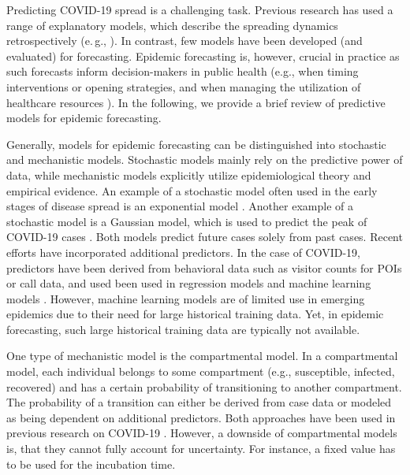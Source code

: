 \documentclass[sigconf, review = false, nonacm = true]{acmart}
\begin{document}
Predicting COVID-19 spread is a challenging task. Previous research has used a range of explanatory models, which describe the spreading dynamics retrospectively (e.\,g., \cite{persson_monitoring_2021, banholzer_impact_2020}). In contrast, few models have been developed (and evaluated) for forecasting. Epidemic forecasting is, however, crucial in practice as such forecasts inform decision-makers in public health (e.g., when timing interventions or opening strategies, and when managing the utilization of healthcare resources \cite{ferguson_report_2020}). In the following, we provide a brief review of predictive models for epidemic forecasting.

Generally, models for epidemic forecasting can be distinguished into stochastic and mechanistic models. Stochastic models mainly rely on the predictive power of data, while mechanistic models explicitly utilize epidemiological theory and empirical evidence. An example of a stochastic model often used in the early stages of disease spread is an exponential model \cite{bertozzi_challenges_2020}. Another example of a stochastic model is a Gaussian model, which is used to predict the peak of COVID-19 cases \cite{schlickeiser_gaussian_2020}. Both models predict future cases solely from past cases. Recent efforts have incorporated additional predictors. In the case of COVID-19, predictors have been derived from behavioral data such as visitor counts for POIs or call data, and used been used in regression models  \cite{rostami-tabar_forecasting_2021} and machine learning models \cite{wieczorek_neural_2020, kapoor_examining_2020}. However, machine learning models are of limited use in emerging epidemics due to their need for large historical training data. Yet, in epidemic forecasting, such large historical training data are typically not available. 

One type of mechanistic model is the compartmental model. In a compartmental model, each individual belongs to some compartment (e.g., susceptible, infected, recovered) and has a certain probability of transitioning to another compartment. The probability of a transition can either be derived from case data or modeled as being dependent on additional predictors. Both approaches have been used in previous research on COVID-19 \cite{pei_differential_2020, chang_mobility_2021, bertozzi_challenges_2020, chinazzi_effect_2020, miller_mobility_2020, zhao_prediction_2020,qian_when_2020}. However, a downside of compartmental models is, that they cannot fully account for uncertainty. For instance, a fixed value has to be used for the incubation time.
\end{document}
